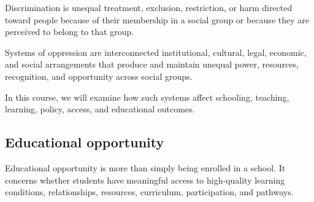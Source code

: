 \documentclass[
  letterpaper,
  DIV=11,
  numbers=noendperiod]{scrartcl}
\begin{document}
\begin{tcolorbox}[enhanced jigsaw, colframe=quarto-callout-note-color-frame, rightrule=.15mm, opacitybacktitle=0.6, leftrule=.75mm, colback=white, breakable, coltitle=black, arc=.35mm, bottomrule=.15mm, titlerule=0mm, left=2mm, colbacktitle=quarto-callout-note-color!10!white, title=\textcolor{quarto-callout-note-color}{\faInfo}\hspace{0.5em}{Discrimination}, toprule=.15mm, bottomtitle=1mm, toptitle=1mm, opacityback=0]

Discrimination is unequal treatment, exclusion, restriction, or harm
directed toward people because of their membership in a social group or
because they are perceived to belong to that group.

\end{tcolorbox}

\begin{tcolorbox}[enhanced jigsaw, colframe=quarto-callout-important-color-frame, rightrule=.15mm, opacitybacktitle=0.6, leftrule=.75mm, colback=white, breakable, coltitle=black, arc=.35mm, bottomrule=.15mm, titlerule=0mm, left=2mm, colbacktitle=quarto-callout-important-color!10!white, title=\textcolor{quarto-callout-important-color}{\faExclamation}\hspace{0.5em}{Systems of oppression}, toprule=.15mm, bottomtitle=1mm, toptitle=1mm, opacityback=0]

Systems of oppression are interconnected institutional, cultural, legal,
economic, and social arrangements that produce and maintain unequal
power, resources, recognition, and opportunity across social groups.

In this course, we will examine how such systems affect schooling,
teaching, learning, policy, access, and educational outcomes.

\end{tcolorbox}

\subsection{Educational opportunity}\label{educational-opportunity}

Educational opportunity is more than simply being enrolled in a school.
It concerns whether students have meaningful access to high-quality
learning conditions, relationships, resources, curriculum,
participation, and pathways.
\end{document}
